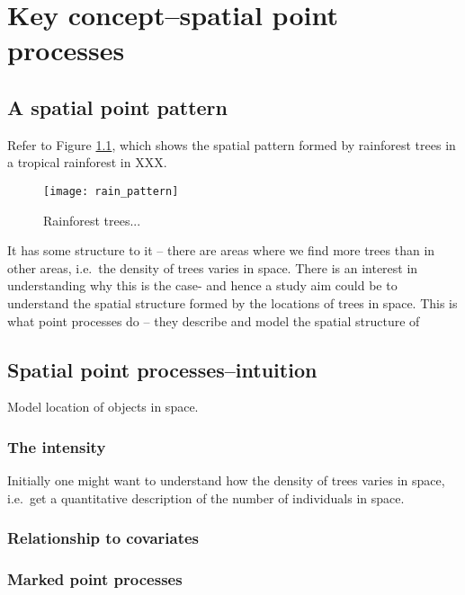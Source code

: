 \chapter{Key concept--spatial point processes}


\section{A spatial point pattern}

Refer to Figure \ref{fig:rainpattern2}, which shows the spatial pattern formed by rainforest trees in a tropical rainforest in XXX. 

\begin{figure}
\centering
\texttt{[image: rain\_pattern]}
\caption{\label{fig:rainpattern2} Rainforest trees...}
\end{figure}

It has some structure to it -- there are areas where we find more trees than in other areas, i.e.\ the density of trees varies in space. There is an interest in understanding why this is the case- and hence a study aim could be to understand the spatial structure formed by the locations of trees in space.
This is what point processes do -- they describe and model the spatial structure of 
 
\section{Spatial point processes--intuition}
Model location of objects in space.

\subsection{The intensity}
Initially one might want to understand how the density of trees varies in space, i.e.\ get a quantitative description of the number of individuals in space.

\subsection{Relationship to covariates}

\subsection{Marked point processes}


